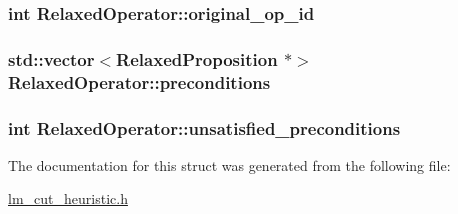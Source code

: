 \hypertarget{structRelaxedOperator_ac0c38c607ffdb80d669f102b826d25a8}{
\subsubsection[{original\-\_\-op\-\_\-id}]{\setlength{\rightskip}{0pt plus 5cm}int Relaxed\-Operator\-::original\-\_\-op\-\_\-id}}\label{structRelaxedOperator_ac0c38c607ffdb80d669f102b826d25a8}
\hypertarget{structRelaxedOperator_acdf732b721b5b04027bfc5978205601c}{
\subsubsection[{preconditions}]{\setlength{\rightskip}{0pt plus 5cm}std\-::vector$<${\bf Relaxed\-Proposition} $\ast$$>$ Relaxed\-Operator\-::preconditions}}\label{structRelaxedOperator_acdf732b721b5b04027bfc5978205601c}
\hypertarget{structRelaxedOperator_a866ae493cc7e77c22aafaf16bf8e4c4f}{
\subsubsection[{unsatisfied\-\_\-preconditions}]{\setlength{\rightskip}{0pt plus 5cm}int Relaxed\-Operator\-::unsatisfied\-\_\-preconditions}}\label{structRelaxedOperator_a866ae493cc7e77c22aafaf16bf8e4c4f}


The documentation for this struct was generated from the following file\-:\begin{DoxyCompactItemize}
\item 
\hyperlink{lm__cut__heuristic_8h}{lm\-\_\-cut\-\_\-heuristic.\-h}\end{DoxyCompactItemize}
